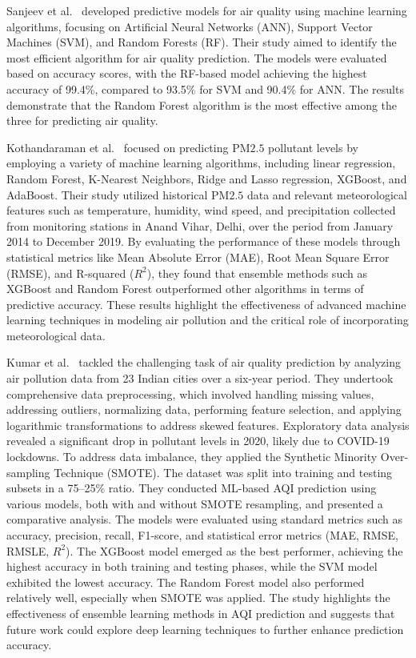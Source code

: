 \documentclass[twoside,11pt]{article}
\begin{document}
Sanjeev et al.\ \citep{Sanjeev2021} developed predictive models for air quality using machine learning algorithms, focusing on Artificial Neural Networks (ANN), Support Vector Machines (SVM), and Random Forests (RF). Their study aimed to identify the most efficient algorithm for air quality prediction. The models were evaluated based on accuracy scores, with the RF-based model achieving the highest accuracy of 99.4\%, compared to 93.5\% for SVM and 90.4\% for ANN. The results demonstrate that the Random Forest algorithm is the most effective among the three for predicting air quality.

Kothandaraman et al.\ \citep{Kothandaraman2022Intelligent} focused on predicting PM${2.5}$ pollutant levels by employing a variety of machine learning algorithms, including linear regression, Random Forest, K-Nearest Neighbors, Ridge and Lasso regression, XGBoost, and AdaBoost. Their study utilized historical PM${2.5}$ data and relevant meteorological features such as temperature, humidity, wind speed, and precipitation collected from monitoring stations in Anand Vihar, Delhi, over the period from January 2014 to December 2019. By evaluating the performance of these models through statistical metrics like Mean Absolute Error (MAE), Root Mean Square Error (RMSE), and R-squared ($R^2$), they found that ensemble methods such as XGBoost and Random Forest outperformed other algorithms in terms of predictive accuracy. These results highlight the effectiveness of advanced machine learning techniques in modeling air pollution and the critical role of incorporating meteorological data.

Kumar et al.\ \citep{Kumar2023} tackled the challenging task of air quality prediction by analyzing air pollution data from 23 Indian cities over a six-year period. They undertook comprehensive data preprocessing, which involved handling missing values, addressing outliers, normalizing data, performing feature selection, and applying logarithmic transformations to address skewed features. Exploratory data analysis revealed a significant drop in pollutant levels in 2020, likely due to COVID-19 lockdowns. To address data imbalance, they applied the Synthetic Minority Over-sampling Technique (SMOTE). The dataset was split into training and testing subsets in a 75–25\% ratio. They conducted ML-based AQI prediction using various models, both with and without SMOTE resampling, and presented a comparative analysis. The models were evaluated using standard metrics such as accuracy, precision, recall, F1-score, and statistical error metrics (MAE, RMSE, RMSLE, $R^2$). The XGBoost model emerged as the best performer, achieving the highest accuracy in both training and testing phases, while the SVM model exhibited the lowest accuracy. The Random Forest model also performed relatively well, especially when SMOTE was applied. The study highlights the effectiveness of ensemble learning methods in AQI prediction and suggests that future work could explore deep learning techniques to further enhance prediction accuracy.
\end{document}
